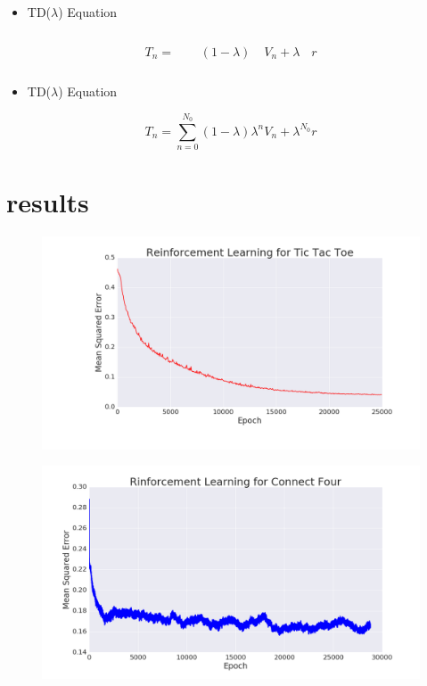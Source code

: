 \begin{frame}
\begin{itemize}
\item TD($\lambda$) Equation
\end{itemize}
\begin{equation*}
T_n = \phantom{\sum_{n=0}^{N_0} }(1-\lambda)\phantom{\lambda^n} V_n + \lambda^{\phantom{N_0}} r
\end{equation*}
\end{frame}

\begin{frame}
\begin{itemize}
\item TD($\lambda$) Equation
\end{itemize}
\begin{equation*}
T_n = \sum_{n=0}^{N_0} (1-\lambda)\lambda^n V_n + \lambda^{N_0} r
\end{equation*}
\end{frame}
\section{results}

\begin{frame}
\begin{figure}
\includegraphics[width=1 \textwidth]{reinforcement_ttt}
\end{figure}
\end{frame}

\begin{frame}
\begin{figure}
\includegraphics[width=1 \textwidth]{reinforcement_c4}
\end{figure}
\end{frame}

